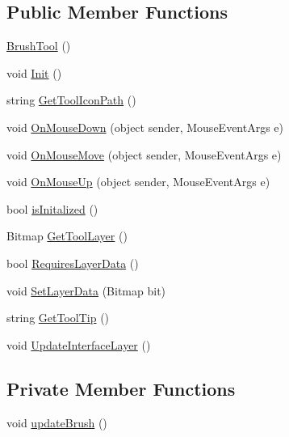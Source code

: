 \subsection*{Public Member Functions}
\begin{DoxyCompactItemize}
\item 
\mbox{\hyperlink{class_paint___program_1_1_brush_tool_aab33da2c4f8f8040ec6947ce6f2d4c74}{Brush\+Tool}} ()
\item 
void \mbox{\hyperlink{class_paint___program_1_1_brush_tool_a8cfef3d531b3e9dcb37d81a5ac0a9ad5}{Init}} ()
\item 
string \mbox{\hyperlink{class_paint___program_1_1_brush_tool_a7cc103269b01a6367edce7c994443739}{Get\+Tool\+Icon\+Path}} ()
\item 
void \mbox{\hyperlink{class_paint___program_1_1_brush_tool_a66b7dbcbb7af665e48b14d9e70a8d22d}{On\+Mouse\+Down}} (object sender, Mouse\+Event\+Args e)
\item 
void \mbox{\hyperlink{class_paint___program_1_1_brush_tool_a4246e31217a616bf6bd251ac2b7ac4e3}{On\+Mouse\+Move}} (object sender, Mouse\+Event\+Args e)
\item 
void \mbox{\hyperlink{class_paint___program_1_1_brush_tool_a20c7beba691866bed3cea6a63400d005}{On\+Mouse\+Up}} (object sender, Mouse\+Event\+Args e)
\item 
bool \mbox{\hyperlink{class_paint___program_1_1_brush_tool_a854fff02dd8dfc6016dcb91b4f7d08f9}{is\+Initalized}} ()
\item 
Bitmap \mbox{\hyperlink{class_paint___program_1_1_brush_tool_ae96d4b9560f8d271694abd1e727dd14c}{Get\+Tool\+Layer}} ()
\item 
bool \mbox{\hyperlink{class_paint___program_1_1_brush_tool_ae96d027fe5ef110b5b00802a2d842a15}{Requires\+Layer\+Data}} ()
\item 
void \mbox{\hyperlink{class_paint___program_1_1_brush_tool_a7419f5d4bfddc97bcd3562171d6625cd}{Set\+Layer\+Data}} (Bitmap bit)
\item 
string \mbox{\hyperlink{class_paint___program_1_1_brush_tool_a29d903eb044890b73e06dd9aac2f5b5e}{Get\+Tool\+Tip}} ()
\item 
void \mbox{\hyperlink{class_paint___program_1_1_brush_tool_ab66c41c9ec1f7175fd0a073cf1dacae9}{Update\+Interface\+Layer}} ()
\end{DoxyCompactItemize}
\subsection*{Private Member Functions}
\begin{DoxyCompactItemize}
\item 
void \mbox{\hyperlink{class_paint___program_1_1_brush_tool_ac008b1a1276758fc91ccb3504ddbe2a2}{update\+Brush}} ()
\end{DoxyCompactItemize}
